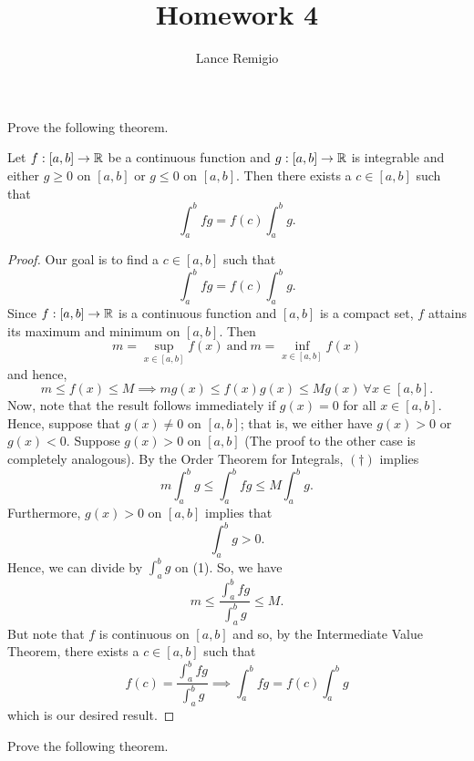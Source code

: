 \documentclass[a4paper]{article}
\title{Homework 4}
\author{Lance Remigio}
\begin{document}
\maketitle


\begin{problem}
   Prove the following theorem. 
\end{problem}
\begin{theorem}
    Let \( f: [a,b] \to \mathbb{R}  \) be a continuous function and \( g:[a,b] \to \mathbb{R}  \) is integrable and either \( g \geq 0  \) on \( [a,b] \) or \( g \leq 0  \) on \( [a,b] \). Then there exists a \( c \in [a,b] \) such that 
    \[  \int_{ a }^{ b } fg = f(c) \int_{ a }^{ b } g.  \]
\end{theorem}
\begin{proof}
    Our goal is to find a \( c \in [a,b] \) such that 
    \[  \int_{ a }^{ b } fg = f(c) \int_{ a }^{ b } g. \]
    Since \( f:[a,b] \to \mathbb{R}  \) is a continuous function and \( [a,b]  \) is a compact set, \( f  \) attains its maximum and minimum on \( [a,b] \). Then 
    \[  m = \sup_{x \in [a,b]} f(x) \ \text{and} \ m = \inf_{x\in[a,b]} f(x) \]
    and hence, 
    \[  m \leq f(x) \leq M  \implies m g(x) \leq f(x) g(x) \leq M g(x) \ \forall x \in [a,b]. \tag{\( \dagger \)} \]
    Now, note that the result follows immediately if \( g(x) = 0  \) for all \( x \in [a,b] \). Hence, suppose that \( g(x) \neq 0  \) on \( [a,b] \); that is, we either have \( g(x) > 0  \) or \( g(x) < 0  \). Suppose \( g(x) > 0  \) on \( [a,b] \) (The proof to the other case is completely analogous). 
    By the Order Theorem for Integrals, \( (\dagger )\) implies
    \[  m \int_{ a }^{ b } g  \leq \int_{ a }^{ b } fg  \leq M \int_{ a }^{ b } g. \tag{1} \]
    Furthermore, \( g(x) > 0  \) on \( [a,b] \) implies that 
    \[  \int_{ a }^{ b } g > 0.  \]
    Hence, we can divide by \( \int_{ a }^{ b } g  \) on (1). So, we have 
    \[  m \leq \frac{ \int_{ a }^{ b } fg  }{ \int_{ a }^{ b } g   } \leq M.  \]
    But note that \( f  \) is continuous on \( [a,b] \) and so, by the Intermediate Value Theorem, there exists a \( c \in [a,b] \) such that 
    \[  f(c) = \frac{ \int_{ a }^{ b } fg   }{ \int_{ a }^{ b } g  } \implies \int_{ a }^{ b } fg = f(c) \int_{ a }^{ b } g \]
    which is our desired result.
    \end{proof}

\begin{problem}
    Prove the following theorem.
\end{problem}
\end{document}
